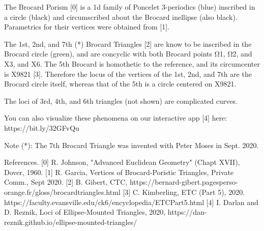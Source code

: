 The Brocard Porism [0] is a 1d family of Poncelet 3-periodics (blue) inscribed in a circle (black) and circumscribed about the Brocard inellipse (also black). Parametrics for their vertices were obtained from [1].

The 1st, 2nd, and 7th (*) Brocard Triangles [2] are know to be inscribed in the Brocard circle (green), and are concyclic with both Brocard points Ω1, Ω2, and X3, and X6. The 5th Brocard is homothetic to the reference, and its circumcenter is X9821 [3]. Therefore the locus of the vertices of the 1st, 2nd, and 7th are the Brocard circle itself, whereas that of the 5th is a circle centered on X9821. 

The loci of 3rd, 4th, and 6th triangles (not shown) are complicated curves.

You can also visualize these phenomena on our interactive app [4] here: https://bit.ly/32GFvQu

Note (*): The 7th Brocard Triangle was invented with Peter Moses in Sept. 2020.

References. 
[0] R. Johnson, "Advanced Euclidean Geometry" (Chapt XVII), Dover, 1960.
[1] R. Garcia, Vertices of Brocard-Poristic Triangles, Private Comm., Sept 2020.
[2] B. Gibert, CTC, https://bernard-gibert.pagesperso-orange.fr/gloss/brocardtriangles.html
[3] C. Kimberling, ETC (Part 5), 2020. https://faculty.evansville.edu/ck6/encyclopedia/ETCPart5.html
[4] I. Darlan and D. Reznik, Loci of Ellipse-Mounted Triangles, 2020, https://dan-reznik.github.io/ellipse-mounted-triangles/
